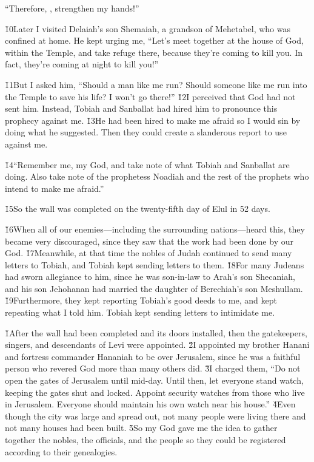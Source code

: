 ``Therefore, , strengthen my hands!''

\v{10}Later I visited Delaiah's son Shemaiah, a grandson of Mehetabel, who was confined at home. He kept urging me, ``Let's meet together at the house of God, within the Temple, and take refuge there, because they're coming to kill you. In fact, they're coming at night to kill you!''

\v{11}But I asked him, ``Should a man like me run? Should someone like me run into the Temple to save his life? I won't go there!'' \v{12}I perceived that God had not sent him. Instead, Tobiah and Sanballat had hired him to pronounce this prophecy against me. \v{13}He had been hired to make me afraid so I would sin by doing what he suggested. Then they could create a slanderous report to use against me.

\v{14}``Remember me, my God, and take note of what Tobiah and Sanballat are doing. Also take note of the prophetess Noadiah and the rest of the prophets who intend to make me afraid.''

\v{15}So the wall was completed on the twenty-fifth day of Elul in 52 days.

\v{16}When all of our enemies---including the surrounding nations---heard this, they became very discouraged, since they saw that the work had been done by our God. \v{17}Meanwhile, at that time the nobles of Judah continued to send many letters to Tobiah, and Tobiah kept sending letters to them. \v{18}For many Judeans had sworn allegiance to him, since he was son-in-law to Arah's son Shecaniah, and his son Jehohanan had married the daughter of Berechiah's son Meshullam. \v{19}Furthermore, they kept reporting Tobiah's good deeds to me, and kept repeating what I told him. Tobiah kept sending letters to intimidate me.

\v{1}After the wall had been completed and its doors installed, then the gatekeepers, singers, and descendants of Levi were appointed. \v{2}I appointed my brother Hanani and fortress commander Hananiah to be over Jerusalem, since he was a faithful person who revered God more than many others did. \v{3}I charged them, ``Do not open the gates of Jerusalem until mid-day. Until then, let everyone stand watch, keeping the gates shut and locked. Appoint security watches from those who live in Jerusalem. Everyone should maintain his own watch near his house.'' \v{4}Even though the city was large and spread out, not many people were living there and not many houses had been built. \v{5}So my God gave me the idea to gather together the nobles, the officials, and the people so they could be registered according to their genealogies.


